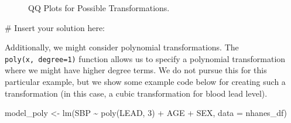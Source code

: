 \documentclass[
  letterpaper,
]{krantz}
\makeatletter
\newenvironment{Shaded}{\begin{snugshade}}{\end{snugshade}}
\newcommand{\AttributeTok}[1]{\textcolor[rgb]{0.40,0.45,0.13}{#1}}
\newcommand{\CommentTok}[1]{\textcolor[rgb]{0.37,0.37,0.37}{#1}}
\newcommand{\DecValTok}[1]{\textcolor[rgb]{0.68,0.00,0.00}{#1}}
\newcommand{\FunctionTok}[1]{\textcolor[rgb]{0.28,0.35,0.67}{#1}}
\newcommand{\NormalTok}[1]{\textcolor[rgb]{0.00,0.23,0.31}{#1}}
\newcommand{\OtherTok}[1]{\textcolor[rgb]{0.00,0.23,0.31}{#1}}
\newcommand{\SpecialCharTok}[1]{\textcolor[rgb]{0.37,0.37,0.37}{#1}}
\newenvironment{kframe}{%
\medskip{}
\setlength{\fboxsep}{.8em}
 \def\at@end@of@kframe{}%
 \ifinner\ifhmode%
  \def\at@end@of@kframe{\end{minipage}}%
  \begin{minipage}{\columnwidth}%
 \fi\fi%
 \def\FrameCommand##1{\hskip\@totalleftmargin \hskip-\fboxsep
 \colorbox{shadecolor}{##1}\hskip-\fboxsep
     \hskip-\linewidth \hskip-\@totalleftmargin \hskip\columnwidth}%
 \MakeFramed {\advance\hsize-\width
   \@totalleftmargin\z@ \linewidth\hsize
   \@setminipage}}%
 {\par\unskip\endMakeFramed%
 \at@end@of@kframe}
\renewenvironment{Shaded}{\begin{kframe}}{\end{kframe}}
\makeatother
\begin{document}
\begin{figure}


\caption{\label{fig-qq-plots}QQ Plots for Possible Transformations.}

\end{figure}%

\begin{Shaded}
\begin{Highlighting}[]
\CommentTok{\# Insert your solution here:}
\end{Highlighting}
\end{Shaded}

Additionally, we might consider polynomial transformations. The
\texttt{poly(x,\ degree=1)} function allows us to specify a polynomial
transformation where we might have higher degree terms. We do not pursue
this for this particular example, but we show some example code below
for creating such a transformation (in this case, a cubic transformation
for blood lead level).

\begin{Shaded}
\begin{Highlighting}[]
\NormalTok{model\_poly }\OtherTok{\textless{}{-}} \FunctionTok{lm}\NormalTok{(SBP }\SpecialCharTok{\textasciitilde{}} \FunctionTok{poly}\NormalTok{(LEAD, }\DecValTok{3}\NormalTok{) }\SpecialCharTok{+}\NormalTok{ AGE }\SpecialCharTok{+}\NormalTok{ SEX, }\AttributeTok{data =}\NormalTok{ nhanes\_df)}
\end{Highlighting}
\end{Shaded}
\end{document}

